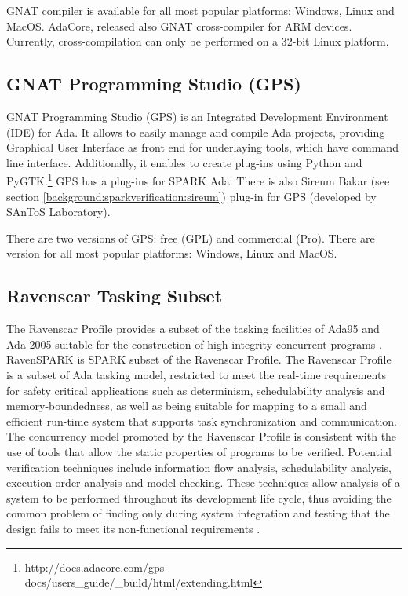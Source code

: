 GNAT compiler is available for all most popular platforms: Windows, Linux and MacOS. AdaCore, released also GNAT cross-compiler for ARM devices. Currently, cross-compilation can only be performed on a 32-bit Linux platform.



\subsection{GNAT Programming Studio (GPS)}
\label{background:spark:gps}

GNAT Programming Studio (GPS) is an Integrated Development Environment (IDE) for Ada. It allows to easily manage and compile Ada projects, providing Graphical User Interface as front end for underlaying tools, which have command line interface. Additionally, it enables to create plug-ins using Python and PyGTK.\footnote{http://docs.adacore.com/gps-docs/users\_guide/\_build/html/extending.html} GPS has a plug-ins for SPARK Ada. There is also Sireum Bakar (see section \ref{background:sparkverification:sireum}) plug-in for GPS (developed by SAnToS Laboratory).

There are two versions of GPS: free (GPL) and commercial (Pro). There are version for all most popular platforms: Windows, Linux and MacOS.



\subsection{Ravenscar Tasking Subset}
\label{background:spark:ravenscar}

The Ravenscar Profile provides a subset of the tasking facilities of Ada95 and Ada 2005 suitable for the construction of high-integrity concurrent programs \cite{Ravenscar:Online}. RavenSPARK is SPARK subset of the Ravenscar Profile. The Ravenscar Profile is a subset of Ada tasking model, restricted to meet the real-time requirements for safety critical applications such as determinism, schedulability analysis and memory-boundedness, as well as being suitable for mapping to a small and efficient run-time system that supports task synchronization and communication. The concurrency model promoted by the Ravenscar Profile is consistent with the use of tools that allow the static properties of programs to be verified. Potential verification techniques include information flow analysis, schedulability analysis, execution-order analysis and model checking. These techniques allow analysis of a system to be performed throughout its development life cycle, thus avoiding the common problem of finding only during system integration and testing that the design fails to meet its non-functional requirements \cite{Ravenscar:Article}. 

